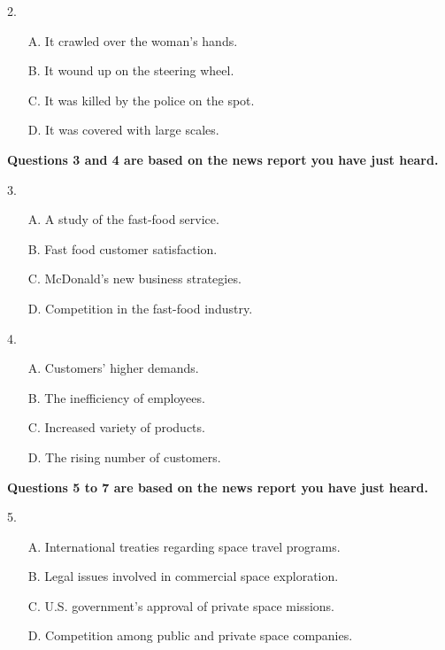 \documentclass[UTF8,11pt]{ctexart}
\begin{document}
2.


\begin{itemize}[leftmargin=2em,itemsep=.2em,topsep=.4em]\item[A.] It crawled over the woman's hands.
\item[B.] It wound up on the steering wheel.
\item[C.] It was killed by the police on the spot.
\item[D.] It was covered with large scales.
\end{itemize}

\textbf{Questions 3 and 4 are based on the news report you have just heard.}


3.


\begin{itemize}[leftmargin=2em,itemsep=.2em,topsep=.4em]\item[A.] A study of the fast-food service.
\item[B.] Fast food customer satisfaction.
\item[C.] McDonald's new business strategies.
\item[D.] Competition in the fast-food industry.
\end{itemize}

4.


\begin{itemize}[leftmargin=2em,itemsep=.2em,topsep=.4em]\item[A.] Customers' higher demands.
\item[B.] The inefficiency of employees.
\item[C.] Increased variety of products.
\item[D.] The rising number of customers.
\end{itemize}

\textbf{Questions 5 to 7 are based on the news report you have just heard.}


5.


\begin{itemize}[leftmargin=2em,itemsep=.2em,topsep=.4em]\item[A.] International treaties regarding space travel programs.
\item[B.] Legal issues involved in commercial space exploration.
\item[C.] U.S. government's approval of private space missions.
\item[D.] Competition among public and private space companies.
\end{itemize}
\end{document}
